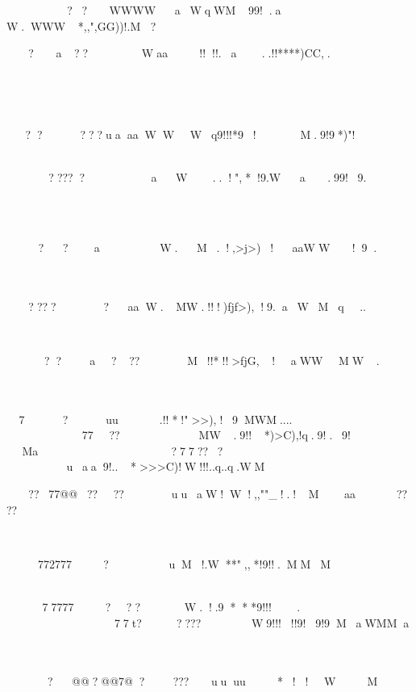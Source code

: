 
??WWWWaWqWM99!.a
W.WWW*,,",GG))!.M
?		


?a??Waa!!!!.a..!!****)CC,.

	





?????uaaaWWWq9!!!*9!M.9!9*)"!

	





?????aW..!",*!9.Wa.99!9.







??
aW.M.!,>j>)!aaWW!9.








?????aaW.MW.!!!)fjf>),!9.aWMq..










??a???M!!*!!>fjG,!aWWMW.
	



	

7?uu.!!*!">>),!9MWM....





	
77??MW.9!!*)>C),!q.9!.9!
Ma





?77???
uaa9!..*>>>C)!W!!!..q..q.WM


??77@@????uuaW!W!,,""_!.!Maa????





772777?uM!.W**",,*!9!!.MMM






77777???W.!.9***9!!!.



77t?????W9!!!!!9!9!9MaWMMa







?@@?@@7@????uuuu*!!WM




